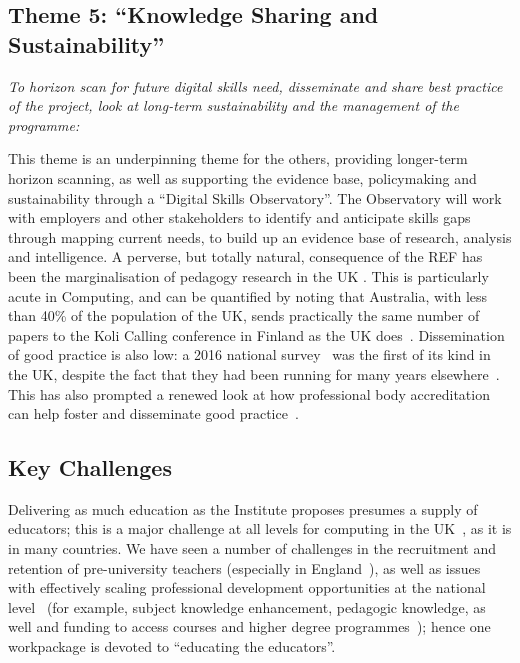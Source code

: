 \documentclass[conference]{IEEEtran}
\begin{document}
\subsection{Theme 5: ``Knowledge Sharing and Sustainability''}

{\emph{To horizon scan for future digital skills need, disseminate and
share best practice of the project, look at long-term sustainability
and the management of the programme:}}\newline

\noindent This theme is an underpinning theme for the others,
providing longer-term horizon scanning, as well as supporting the
evidence base, policymaking and sustainability through a ``Digital
Skills Observatory''. The Observatory will work with employers and
other stakeholders to identify and anticipate skills gaps through
mapping current needs, to build up an evidence base of research,
analysis and intelligence.  A perverse, but totally natural,
consequence of the REF has been the marginalisation of pedagogy
research in the UK \cite{Cottonetal2018a}. This is particularly acute
in Computing, and can be quantified by noting that Australia, with
less than 40\% of the population of the UK, sends practically the same
number of papers to the Koli Calling conference in Finland as the UK
does~\cite{Simon2016a}. Dissemination of good practice is also low: a
2016 national survey~\cite{murphy-et-al:programming2017} was the first
of its kind in the UK, despite the fact that they had been running for
many years elsewhere~\cite{simon-et-al:sigcse2018}. This has also
prompted a renewed look at how professional body accreditation can help
foster and disseminate good practice~\cite{crick-et-al:cep2020}.

\subsection{Key Challenges}

Delivering as much education as the Institute proposes presumes a
supply of educators; this is a major challenge at all levels for
computing in the UK~\cite{brown-et-al:toce2014}, as it is in many
countries. We have seen a number of challenges in the recruitment and
retention of pre-university teachers (especially in
England~\cite{sentance+waite:2018}), as well as issues with
effectively scaling professional development opportunities at the
national level~\cite{sentance+csizmadia:2017} (for example, subject
knowledge enhancement, pedagogic knowledge, as well and funding to
access courses and higher degree
programmes~\cite{sentance-et-al-wipsce2012,moller+crick:jce2018});
hence one workpackage is devoted to ``educating the educators''.
\end{document}
